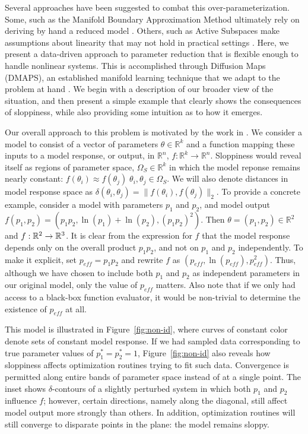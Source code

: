 Several approaches have been suggested to combat this
over-parameterization. Some, such as the Manifold Boundary
Approximation Method ultimately rely on deriving by hand a reduced
model \cite{transtrum_model_2014}. Others, such as Active Subspaces
make assumptions about linearity that may not hold in practical
settings \cite{constantine_active_2015}. Here, we present a
data-driven approach to parameter reduction that is flexible enough to
handle nonlinear systems. This is accomplished through Diffusion Maps
(DMAPS), an established manifold learning technique that we adapt to
the problem at hand \cite{coifman_diffusion_2006}. We begin with a
description of our broader view of the situation, and then present a
simple example that clearly shows the consequences of sloppiness,
while also providing some intuition as to how it emerges.

Our overall approach to this problem is motivated by the work in
\cite{transtrum_geometry_2011}. We consider a model to consist of a
vector of parameters $\theta \in \mathbb{R}^k$ and a function mapping
these inputs to a model response, or output, in $\mathbb{R}^n$,
$f: \mathbb{R}^k \rightarrow \mathbb{R}^n$. Sloppiness would reveal
itself as regions of parameter space, $\Omega_S \in \mathbb{R}^k$ in
which the model reponse remains nearly constant:
$f(\theta_i) \approx f(\theta_j)\; \theta_i, \theta_j \in
\Omega_S$. We will also denote distances in model response space as
$\delta(\theta_i, \theta_j) = \| f(\theta_i), f(\theta_j)\|_2$. To
provide a concrete example, consider a model with parameters $p_1$ and
$p_2$, and model output
$f(p_1, p_2) = (p_1 p_2 , \ln(p_1) + \ln(p_2) , (p_1 p_2)^2)$. Then
$\theta = (p_1, p_2) \in \mathbb{R}^2$ and $f: \mathbb{R}^2 \rightarrow
\mathbb{R}^3$. It is clear from the expression for $f$ that the model response
depends only on the overall product $p_1 p_2$, and not on $p_1$ and
$p_2$ independently. To make it explicit, set $p_{eff} = p_1 p_2$ and
rewrite $f$ as $(p_{eff}, \ln(p_{eff}), p_{eff}^2)$. Thus, although we
have chosen to include both $p_1$ and $p_2$ as independent parameters
in our original model, only the value of $p_{eff}$ matters. Also note
that if we only had access to a black-box function evaluator, it would
be non-trivial to determine the existence of $p_{eff}$ at all.

This model is illustrated in Figure~\ref{fig:non-id}, where curves of
constant color denote sets of constant model response. If we had
sampled data corresponding to true parameter values of
$p_1^* = p_2^* = 1$, Figure~\ref{fig:non-id} also reveals how
sloppiness affects optimization routines trying to fit such
data. Convergence is permitted along entire bands of parameter space
instead of at a single point. The inset shows $\delta$-contours of a
slightly perturbed system in which both $p_1$ and $p_2$ influence $f$;
however, certain directions, namely along the diagonal, still affect
model output more strongly than others. In addition, optimization
routines will still converge to disparate points in the plane: the
model remains sloppy.

